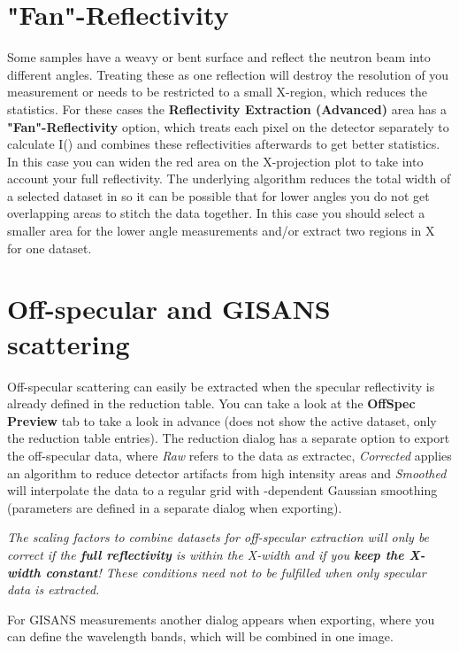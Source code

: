   \section{"Fan"-Reflectivity}
  \label{sec:fan}
    Some samples have a weavy or bent surface and reflect the neutron beam into different angles. 
    Treating these as one reflection will destroy the \Qz resolution of you measurement or needs to be restricted to a small X-region, which reduces the statistics.
    For these cases the \textbf{Reflectivity Extraction (Advanced)} area has a \textbf{"Fan"-Reflectivity} option, which treats each pixel on the detector separately to calculate I(\Qz) and combines these reflectivities afterwards to get better statistics. 
    In this case you can widen the red area on the X-projection plot to take into account your full reflectivity.
    The underlying algorithm reduces the total width of a selected dataset in \Qz so it can be possible that for lower angles you do not get overlapping areas to stitch the data together.
    In this case you should select a smaller area for the lower angle measurements and/or extract two regions in X for one dataset.
  
  \section{Off-specular and GISANS scattering}
    Off-specular scattering can easily be extracted when the specular reflectivity is already defined in the reduction table. You can take a look at the \textbf{OffSpec Preview} tab to take a look in advance (does not show the active dataset, only the reduction table entries).
    The reduction dialog has a separate option to export the off-specular data, where \textit{Raw} refers to the data as extractec, \textit{Corrected} applies an algorithm to reduce detector artifacts from high intensity areas and \textit{Smoothed} will interpolate the data to a regular grid with \Qz-dependent Gaussian smoothing (parameters are defined in a separate dialog when exporting).
    
    \textit{The scaling factors to combine datasets for off-specular extraction will only be correct if the \textbf{full reflectivity} is within the X-width and if you \textbf{keep the X-width constant}! These conditions need not to be fulfilled when only specular data is extracted.}
    
    For GISANS measurements another dialog appears when exporting, where you can define the wavelength bands, which will be combined in one image.
  
  
